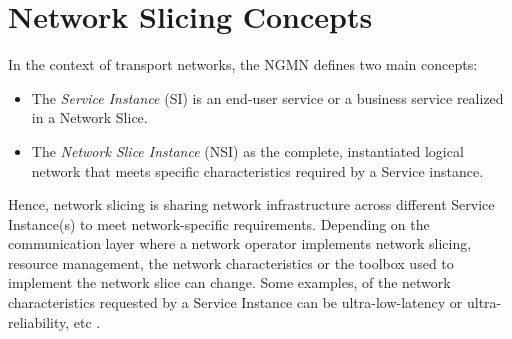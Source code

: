 \documentclass[journal,article,submit,moreauthors,pdftex]{Definitions/mdpi}
\begin{document}





\section{Network Slicing Concepts}

In the context of transport networks, the NGMN defines two main concepts\cite{alliance2016description}: 
\begin{itemize}
    \item The \textit{Service Instance} (SI) is an end-user service or a business service realized in a Network Slice.
    \item The \textit{Network Slice Instance} (NSI) as the complete, instantiated logical network that meets specific characteristics required by a Service instance.
\end{itemize}
Hence, network slicing is sharing network infrastructure across different Service Instance(s) to meet network-specific requirements. Depending on the communication layer where a network operator implements network slicing, resource management, the network characteristics or the toolbox used to implement the network slice can change. Some examples, of the network characteristics requested by a Service Instance can be ultra-low-latency or ultra-reliability, etc \cite{alliance2016description,}. 
\end{document}
